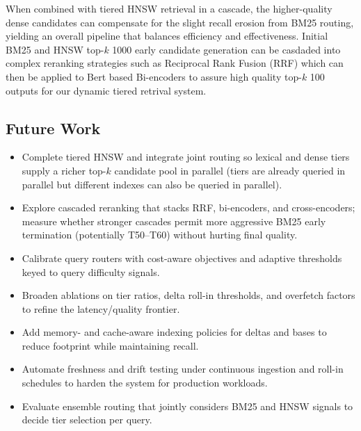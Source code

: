 \documentclass[11pt]{article}
\begin{document}
When combined with tiered HNSW retrieval in a cascade, the higher-quality dense candidates can compensate for the slight recall erosion from BM25 routing, yielding an overall pipeline that balances efficiency and effectiveness. Initial BM25 and HNSW top-$k$ 1000 early candidate generation can be casdaded into complex reranking strategies such as Reciprocal Rank Fusion (RRF) which can then be applied to Bert based Bi-encoders to assure high quality top-$k$ 100 outputs for our dynamic tiered retrival system.

\subsection{Future Work}
\begin{itemize}
  \item Complete tiered HNSW and integrate joint routing so lexical and dense tiers supply a richer top-$k$ candidate pool in parallel (tiers are already queried in parallel but different indexes can also be queried in parallel).
  \item Explore cascaded reranking that stacks RRF, bi-encoders, and cross-encoders; measure whether stronger cascades permit more aggressive BM25 early termination (potentially T50–T60) without hurting final quality.
  \item Calibrate query routers with cost-aware objectives and adaptive thresholds keyed to query difficulty signals.
  \item Broaden ablations on tier ratios, delta roll-in thresholds, and overfetch factors to refine the latency/quality frontier.
  \item Add memory- and cache-aware indexing policies for deltas and bases to reduce footprint while maintaining recall.
  \item Automate freshness and drift testing under continuous ingestion and roll-in schedules to harden the system for production workloads.
  \item Evaluate ensemble routing that jointly considers BM25 and HNSW signals to decide tier selection per query.
\end{itemize}
\end{document}
